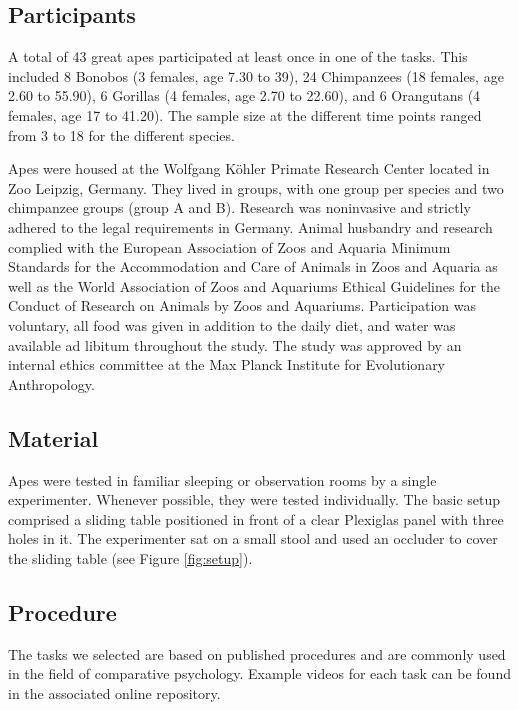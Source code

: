 \documentclass[
  man,floatsintext]{apa6}
\begin{document}
\hypertarget{participants}{%
\subsection{Participants}\label{participants}}

A total of 43 great apes participated at least once in one of the tasks. This included 8 Bonobos (3 females, age 7.30 to 39), 24 Chimpanzees (18 females, age 2.60 to 55.90), 6 Gorillas (4 females, age 2.70 to 22.60), and 6 Orangutans (4 females, age 17 to 41.20). The sample size at the different time points ranged from 3 to 18 for the different species.

Apes were housed at the Wolfgang Köhler Primate Research Center located in Zoo Leipzig, Germany. They lived in groups, with one group per species and two chimpanzee groups (group A and B). Research was noninvasive and strictly adhered to the legal requirements in Germany. Animal husbandry and research complied with the European Association of Zoos and Aquaria Minimum Standards for the Accommodation and Care of Animals in Zoos and Aquaria as well as the World Association of Zoos and Aquariums Ethical Guidelines for the Conduct of Research on Animals by Zoos and Aquariums. Participation was voluntary, all food was given in addition to the daily diet, and water was available ad libitum throughout the study. The study was approved by an internal ethics committee at the Max Planck Institute for Evolutionary Anthropology.

\hypertarget{material}{%
\subsection{Material}\label{material}}

Apes were tested in familiar sleeping or observation rooms by a single experimenter. Whenever possible, they were tested individually. The basic setup comprised a sliding table positioned in front of a clear Plexiglas panel with three holes in it. The experimenter sat on a small stool and used an occluder to cover the sliding table (see Figure \ref{fig:setup}).

\hypertarget{procedure}{%
\subsection{Procedure}\label{procedure}}

The tasks we selected are based on published procedures and are commonly used in the field of comparative psychology. Example videos for each task can be found in the associated online repository.
\end{document}
